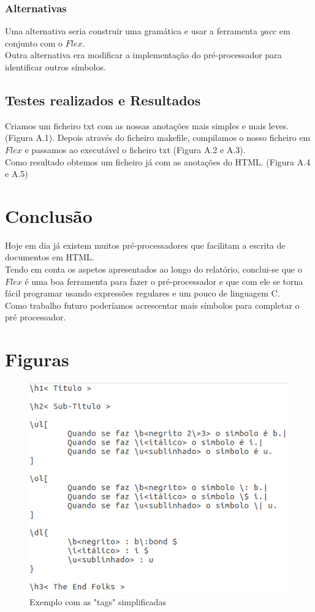 \documentclass{report}
\begin{document}
\subsection{Alternativas}

Uma alternativa seria construir uma gramática e usar a ferramenta $yacc$ em conjunto com o $Flex$.\\
Outra alternativa era modificar a implementação do pré-processador para identificar outros símbolos.

\section{Testes realizados e Resultados}

Criamos um ficheiro txt com as nossas anotações mais simples e mais leves. (Figura A.1). Depois através do ficheiro makefile, compilamos o nosso ficheiro em $Flex$ e passamos ao executável o ficheiro txt (Figura A.2 e A.3).\\ 
Como resultado obtemos um ficheiro já com as anotações do HTML. (Figura A.4 e A.5) 



\chapter{Conclusão} \label{concl}

Hoje em dia já existem muitos pré-processadores que facilitam a escrita de documentos em HTML.\\
Tendo em conta os aspetos apresentados ao longo do relatório, conclui-se que o $Flex$ é uma boa ferramenta para fazer o pré-processador e que com ele se torna fácil programar usando expressões regulares e um pouco de linguagem C. \\
Como trabalho futuro poderíamos acrescentar mais símbolos para completar o pré processador.


\appendix
\chapter{Figuras}
\begin{figure}[h]
\centering
\includegraphics[scale= 0.5]{exemplo1.png}
\caption{Exemplo com as "tags" simplificadas}
\label{Exemplo 1}
\end{figure}
\end{document}
